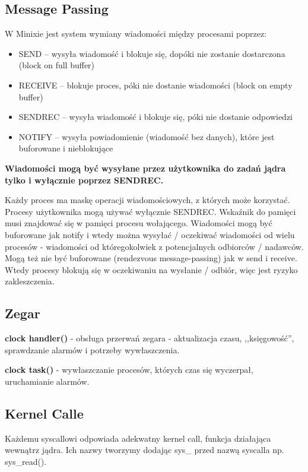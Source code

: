 \subsection{Message Passing}
W Minixie jest system wymiany wiadomości między procesami poprzez:
\begin{itemize}
	\item SEND -- wysyła wiadomość i blokuje się, dopóki nie zostanie dostarczona (block on full buffer)
	\item RECEIVE -- blokuje proces, póki nie dostanie wiadomości (block on empty buffer)
	\item SENDREC -- wysyła wiadomość i blokuje się, póki nie dostanie odpowiedzi
	\item NOTIFY -- wysyła powiadomienie (wiadomość bez danych), które jest buforowane i nieblokujące
\end{itemize}
\textbf{Wiadomości mogą być wysyłane przez użytkownika do zadań jądra tylko i wyłącznie poprzez SENDREC.}

Każdy proces ma maskę operacji wiadomościowych, z których może korzystać. Procesy użytkownika mogą używać wyłącznie SENDREC.
Wskaźnik do pamięci musi znajdować się w pamięci procesu wołającego.
Wiadomości mogą być buforowane jak notify i wtedy można wysyłać / oczekiwać wiadomości od wielu procesów - wiadomości od któregokolwiek z potencjalnych odbiorców / nadawców. Mogą też nie być buforowane (rendezvous message-passing) jak w send i receive. Wtedy procesy blokują się w oczekiwaniu na wysłanie / odbiór, więc jest ryzyko zakleszczenia.
\subsection{Zegar}
\textbf{clock handler()} - obsługa przerwań zegara - aktualizacja czasu, ,,księgowość”, sprawdzanie alarmów i potrzeby wywłaszczenia.

\textbf{clock task()} - wywłaszczanie procesów, których czas się wyczerpał, uruchamianie alarmów.
\subsection{Kernel Calle}
Każdemu syscallowi odpowiada adekwatny kernel call, funkcja działająca wewnątrz jądra. Ich nazwy tworzymy dodając sys\_ przed nazwą syscalla np. sys\_read().
